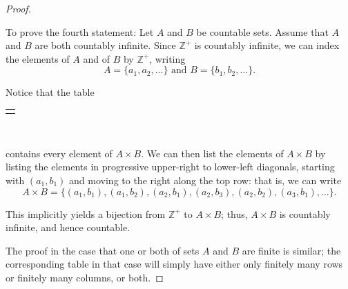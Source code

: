 \documentclass[10pt,openany,oneside]{book}
\theoremstyle{plain}
\theoremstyle{definition}
\theoremstyle{definition}
\theoremstyle{definition}
\theoremstyle{definition}
\numberwithin{equation}{section}
\newlength{\panelmax}
\def\Z{\mathbb{Z}}
\begin{document}
\begin{proof}\hypertarget{proof-4}{}
To prove the fourth statement: Let \(A\) and \(B\) be countable sets. Assume that \(A\) and \(B\) are both countably infinite. Since \(\Z^+\) is countably infinite, we can index the elements of \(A\) and of \(B\) by \(\Z^+\), writing%
\begin{equation*}
A=\{a_1,a_2,\ldots\} \text{ and }  B=\{b_1,b_2,\ldots\}.
\end{equation*}
%
\par
Notice that the table%
{%
\setlength{\panelmax}{0pt}
\newsavebox{\panelboxBtabular}
\newlength{\phBtabular}\setlength{\phBtabular}{\ht\panelboxBtabular+\dp\panelboxBtabular}
\settototalheight{\phBtabular}{\usebox{\panelboxBtabular}}
\setlength{\panelmax}{\maxof{\panelmax}{\phBtabular}}
\leavevmode%
\setlength{\tabcolsep}{0\linewidth}
\par\medskip\noindent
\begin{tabular}{@{}*{1}{c}@{}}
\begin{minipage}[c][\panelmax][t]{1\linewidth}\usebox{\panelboxBtabular}\end{minipage}\end{tabular}\\
}%
\par
contains every element of \(A\times B\). We can then list the elements of \(A\times B\) by listing the elements in progressive upper-right to lower-left diagonals, starting with \((a_1,b_1)\) and moving to the right along the top row: that is, we can write%
\begin{equation*}
A\times B=\{(a_1,b_1),(a_1,b_2),(a_2,b_1),(a_2,b_3),(a_2,b_2),(a_3,b_1),\ldots\}.
\end{equation*}
%
\par
This implicitly yields a bijection from \(\Z^+\) to \(A\times B\); thus, \(A\times B\) is countably infinite, and hence countable.%
\par
The proof in the case that one or both of sets \(A\) and \(B\) are finite is similar; the corresponding table in that case will simply have either only finitely many rows or finitely many columns, or both.%
\end{proof}
\end{document}
